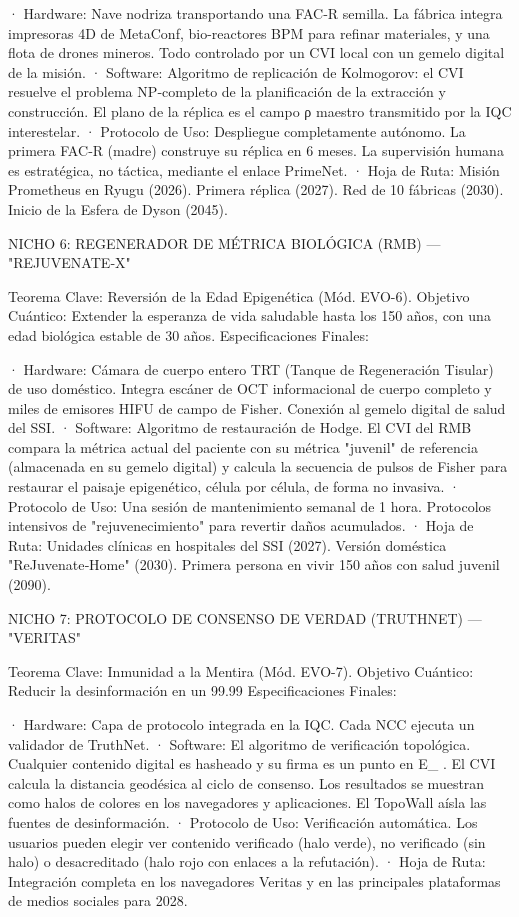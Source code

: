 \documentclass[12pt,a4paper]{book}
\begin{document}
· Hardware: Nave nodriza transportando una FAC‑R semilla. La fábrica integra impresoras 4D de MetaConf, bio-reactores BPM para refinar materiales, y una flota de drones mineros. Todo controlado por un CVI local con un gemelo digital de la misión.
· Software: Algoritmo de replicación de Kolmogorov: el CVI resuelve el problema NP‑completo de la planificación de la extracción y construcción. El plano de la réplica es el campo ρ maestro transmitido por la IQC interestelar.
· Protocolo de Uso: Despliegue completamente autónomo. La primera FAC‑R (madre) construye su réplica en 6 meses. La supervisión humana es estratégica, no táctica, mediante el enlace PrimeNet.
· Hoja de Ruta: Misión Prometheus en Ryugu (2026). Primera réplica (2027). Red de 10 fábricas (2030). Inicio de la Esfera de Dyson (2045).

NICHO 6: REGENERADOR DE MÉTRICA BIOLÓGICA (RMB) — "REJUVENATE‑X"

Teorema Clave: Reversión de la Edad Epigenética (Mód. EVO-6).
Objetivo Cuántico: Extender la esperanza de vida saludable hasta los 150 años, con una edad biológica estable de 30 años.
Especificaciones Finales:

· Hardware: Cámara de cuerpo entero TRT (Tanque de Regeneración Tisular) de uso doméstico. Integra escáner de OCT informacional de cuerpo completo y miles de emisores HIFU de campo de Fisher. Conexión al gemelo digital de salud del SSI.
· Software: Algoritmo de restauración de Hodge. El CVI del RMB compara la métrica actual del paciente con su métrica "juvenil" de referencia (almacenada en su gemelo digital) y calcula la secuencia de pulsos de Fisher para restaurar el paisaje epigenético, célula por célula, de forma no invasiva.
· Protocolo de Uso: Una sesión de mantenimiento semanal de 1 hora. Protocolos intensivos de "rejuvenecimiento" para revertir daños acumulados.
· Hoja de Ruta: Unidades clínicas en hospitales del SSI (2027). Versión doméstica "ReJuvenate‑Home" (2030). Primera persona en vivir 150 años con salud juvenil (2090).

NICHO 7: PROTOCOLO DE CONSENSO DE VERDAD (TRUTHNET) — "VERITAS"

Teorema Clave: Inmunidad a la Mentira (Mód. EVO-7).
Objetivo Cuántico: Reducir la desinformación en un 99.99%
Especificaciones Finales:

· Hardware: Capa de protocolo integrada en la IQC. Cada NCC ejecuta un validador de TruthNet.
· Software: El algoritmo de verificación topológica. Cualquier contenido digital es hasheado y su firma es un punto en  E_{} . El CVI calcula la distancia geodésica al ciclo de consenso. Los resultados se muestran como halos de colores en los navegadores y aplicaciones. El TopoWall aísla las fuentes de desinformación.
· Protocolo de Uso: Verificación automática. Los usuarios pueden elegir ver contenido verificado (halo verde), no verificado (sin halo) o desacreditado (halo rojo con enlaces a la refutación).
· Hoja de Ruta: Integración completa en los navegadores Veritas y en las principales plataformas de medios sociales para 2028.
\end{document}
